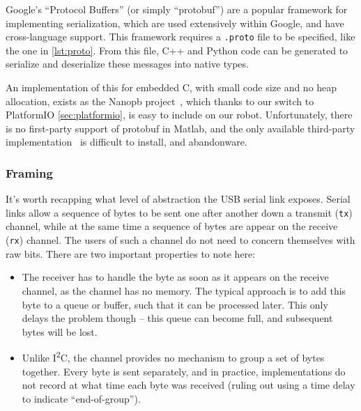 \documentclass[main.tex]{subfiles}
\begin{document}
		Google’s \enquote{Protocol Buffers}\cite{protobuf} (or simply \enquote{protobuf}) are a popular framework for implementing serialization, which are used extensively within Google, and have cross-language support.
		This framework requires a \texttt{.proto} file to be specified, like the one in \cref{lst:proto}.
		From this file, C++ and Python code can be generated to serialize and deserialize these messages into native types.

		An implementation of this for embedded C, with small code size and no heap allocation, exists as the Nanopb project~\cite{nanopb}, which thanks to our switch to PlatformIO \cref{sec:platformio}, is easy to include on our robot.
		Unfortunately, there is no first-party support of protobuf in Matlab, and the only available third-party implementation~\cite{protobuf-matlab} is difficult to install, and abandonware.\footnotemark


	\subsubsection{Framing}

		It's worth recapping what level of abstraction the USB serial link exposes.
		Serial links allow a sequence of bytes to be sent one after another down a transmit (\texttt{tx}) channel, while at the same time a sequence of bytes are appear on the receive (\texttt{rx}) channel. The users of such a channel do not need to concern themselves with raw bits. There are two important properties to note here:
		\begin{itemize}[noitemsep]
			\item
				The receiver has to handle the byte as soon as it appears on the receive channel, as the channel has no memory.
				The typical approach is to add this byte to a queue or buffer, such that it can be processed later.
				This only delays the problem though -- this queue can become full, and subsequent bytes will be lost.
			\item
				Unlike I\textsuperscript{2}C, the channel provides no mechanism to group a set of bytes together.
				Every byte is sent separately, and in practice, implementations do not record at what time each byte was received (ruling out using a time delay to indicate \enquote{end-of-group}).
		\end{itemize}
\end{document}
